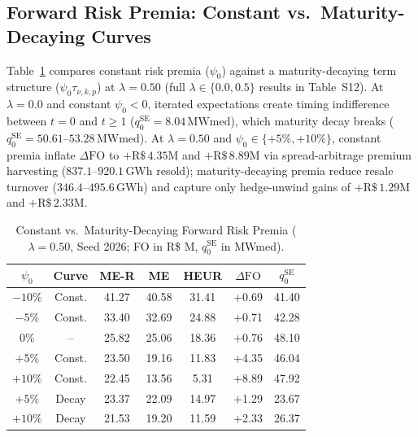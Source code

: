 \documentclass[10pt,journal]{IEEEtran}
\begin{document}
\subsection{Forward Risk Premia: Constant vs.\ Maturity-Decaying Curves}
\label{sec:premio}
Table~\ref{tab:premio_risco} compares constant risk premia ($\psi_0$) against a maturity-decaying term structure ($\psi_0 \tau_{\nu,k,p}$) at $\lambda = 0.50$ (full $\lambda \in \{0.0, 0.5\}$ results in Table~S12). At $\lambda = 0.0$ and constant $\psi_0 < 0$, iterated expectations create timing indifference between $t=0$ and $t \ge 1$ ($q_0^{\text{SE}} = 8.04\,\text{MWmed}$), which maturity decay breaks ($q_0^{\text{SE}} = 50.61$--$53.28\,\text{MWmed}$). At $\lambda = 0.50$ and $\psi_0 \in \{+5\%, +10\%\}$, constant premia inflate $\Delta\mathrm{FO}$ to $+\text{R\$}\,4.35\text{M}$ and $+\text{R\$}\,8.89\text{M}$ via spread-arbitrage premium harvesting ($837.1$--$920.1\,\text{GWh}$ resold); maturity-decaying premia reduce resale turnover ($346.4$--$495.6\,\text{GWh}$) and capture only hedge-unwind gains of $+\text{R\$}\,1.29\text{M}$ and $+\text{R\$}\,2.33\text{M}$.

\begin{table}[t]
\centering
\caption{Constant vs.\ Maturity-Decaying Forward Risk Premia ($\lambda = 0.50$, Seed 2026; FO in R\$ M, $q_0^{\text{SE}}$ in MWmed).}
\label{tab:premio_risco}
\scriptsize
\setlength{\tabcolsep}{2.5pt}
\begin{tabular}{ccccccc}
\toprule
$\psi_0$ & Curve & ME-R & ME & HEUR & $\Delta\mathrm{FO}$ & $q_0^{\text{SE}}$ \\
\midrule
$-10\%$ & Const. & 41.27 & 40.58 & 31.41 & +0.69 & 41.40 \\
$-5\%$  & Const. & 33.40 & 32.69 & 24.88 & +0.71 & 42.28 \\
$0\%$   & --     & 25.82 & 25.06 & 18.36 & +0.76 & 48.10 \\
$+5\%$  & Const. & 23.50 & 19.16 & 11.83 & +4.35 & 46.04 \\
$+10\%$ & Const. & 22.45 & 13.56 & 5.31  & +8.89 & 47.92 \\
\midrule
$+5\%$  & Decay  & 23.37 & 22.09 & 14.97 & +1.29 & 23.67 \\
$+10\%$ & Decay  & 21.53 & 19.20 & 11.59 & +2.33 & 26.37 \\
\bottomrule
\end{tabular}
\end{table}
\end{document}
